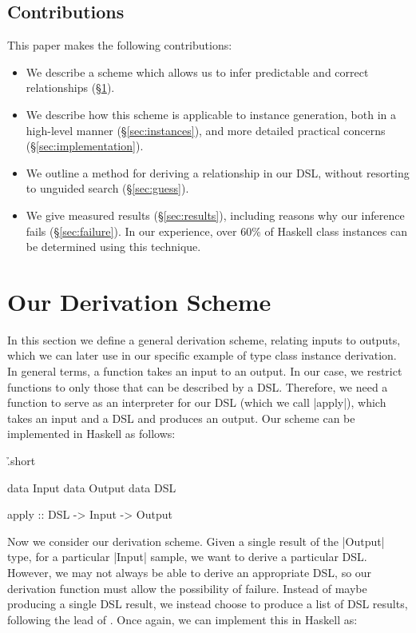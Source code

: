 \documentclass[preprint,draft]{sigplanconf}
\begin{document}
\subsection{Contributions}

This paper makes the following contributions:

\begin{itemize}
\item We describe a scheme which allows us to infer predictable and correct relationships (\S\ref{sec:scheme}).
\item We describe how this scheme is applicable to instance generation, both in a high-level manner (\S\ref{sec:instances}), and more detailed practical concerns (\S\ref{sec:implementation}).
\item We outline a method for deriving a relationship in our DSL, without resorting to unguided search (\S\ref{sec:guess}).
\item We give measured results (\S\ref{sec:results}), including reasons why our inference fails (\S\ref{sec:failure}). In our experience, over 60\% of Haskell class instances can be determined using this technique.
\end{itemize}

\section{Our Derivation Scheme}
\label{sec:scheme}

In this section we define a general derivation scheme, relating inputs to outputs, which we can later use in our specific example of type class instance derivation. In general terms, a function takes an input to an output. In our case, we restrict functions to only those that can be described by a DSL. Therefore, we need a function to serve as an interpreter for our DSL (which we call |apply|), which takes an input and a DSL and produces an output. Our scheme can be implemented in Haskell as follows:

\h{.short}\begin{code}
data Input
data Output
data DSL

apply :: DSL -> Input -> Output
\end{code}

Now we consider our derivation scheme. Given a single result of the |Output| type, for a particular |Input| sample, we want to derive a particular DSL. However, we may not always be able to derive an appropriate DSL, so our derivation function must allow the possibility of failure. Instead of maybe producing a single DSL result, we instead choose to produce a list of DSL results, following the lead of \citet{wadler:list_of_successes}. Once again, we can implement this in Haskell as:
\end{document}
